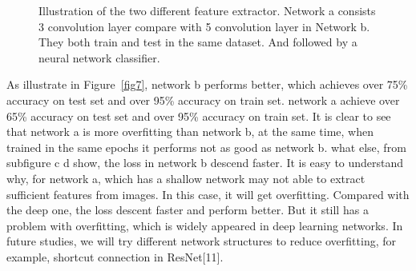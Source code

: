 \documentclass[runningheads]{llncs}
\begin{document}
\begin{figure}[htbp]
	\centering
	
	\caption{Illustration of the two different feature extractor. Network a consists 3 convolution layer compare with 5 convolution layer in Network b. They both train and test in the same dataset. And followed by a neural network classifier.}
	\label{fig6}
\end{figure}


As illustrate in Figure~\ref{fig7}, network b performs better, which achieves over 75\% accuracy on test set and over 95\% accuracy on train set. network a achieve over 65\% accuracy on test set and over 95\% accuracy on train set. It is clear to see that network a is more overfitting than network b, at the same time, when trained in the same epochs it performs not as good as network b. what else, from subfigure c d show, the loss in network b descend faster. It is easy to understand why, for network a, which has a shallow network may not able to extract sufficient features from images. In this case, it will get overfitting. Compared with the deep one, the loss descent faster and perform better. But it still has a problem with overfitting, which is widely appeared in deep learning networks. In future studies, we will try different network structures to reduce overfitting, for example, shortcut connection in ResNet[11].
\end{document}
